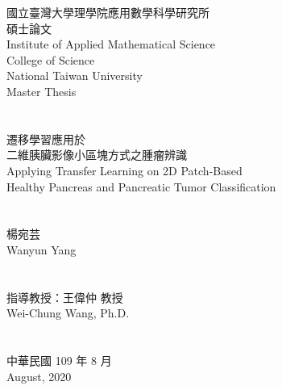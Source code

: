 \documentclass[12pt]{report}
\begin{document}
\onehalfspacing


\begin{titlepage}
\begin{center}

\begin{CJK}{UTF8}{bkai}
\Large{{國立臺灣大學理學院應用數學科學研究所\\碩士論文}}\\
\large{{Institute of Applied Mathematical Science}}\\
\large{College of Science}\\
\Large{{National Taiwan University}}\\
\Large{{Master Thesis}}\\

\hspace*{1cm}~\\
\hspace*{1cm}~\\

\Large{遷移學習應用於\\
二維胰臟影像小區塊方式之腫瘤辨識\\
Applying Transfer Learning on 
2D Patch-Based \\Healthy Pancreas and Pancreatic Tumor Classification}\\

\hspace*{1cm}~\\
\hspace*{1cm}~\\

\Large{楊宛芸\\Wanyun Yang}\\
\hspace*{1cm}~\\
\hspace*{1cm}~\\

\Large{指導教授：王偉仲 教授\\Wei-Chung Wang, Ph.D.}\\
\hspace*{1cm}~\\
\hspace*{1cm}~\\

\Large{中華民國 109 年 8 月}\\ 
\Large{August, 2020}\\ 

\end{CJK}
\end{center}
\end{titlepage}
\end{document}
